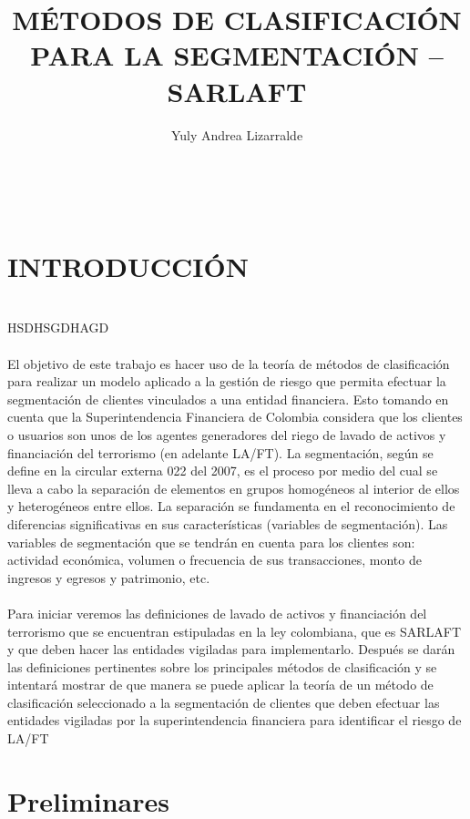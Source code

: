 \documentclass[letterpaper,12pt, spanish]{article}
\begin{document}
\setcounter{page}{1}
\newpage{\pagestyle{empty}\cleardoublepage}
\title{MÉTODOS DE CLASIFICACIÓN PARA LA SEGMENTACIÓN – SARLAFT}
\author{Yuly Andrea Lizarralde}
\date{}
\maketitle
\ \\
\newpage{\pagestyle{empty}\cleardoublepage}
\tableofcontents{}
\newpage{\pagestyle{empty}\cleardoublepage}
\section{INTRODUCCIÓN}
\ \\
HSDHSGDHAGD
\ \\
\ \\
El objetivo de este trabajo es hacer uso de la teoría de métodos de clasificación para  realizar un modelo aplicado a la gestión de riesgo que permita efectuar la segmentación de clientes vinculados a una entidad financiera.  Esto tomando en cuenta que la Superintendencia Financiera de Colombia considera que los clientes o usuarios son unos de los agentes generadores del riego de lavado de activos y financiación del terrorismo (en adelante LA/FT). La segmentación, según se define en la circular externa 022 del 2007, es el proceso por medio del cual se lleva a cabo la separación de elementos en grupos homogéneos al interior de ellos y heterogéneos entre ellos. La separación se fundamenta en el reconocimiento de diferencias significativas en sus características (variables de segmentación).  Las variables de segmentación que se tendrán en cuenta para los clientes son: actividad económica, volumen o frecuencia de sus transacciones, monto de ingresos y egresos y patrimonio, etc.
\ \\
\ \\
Para iniciar veremos las definiciones de lavado de activos y financiación del terrorismo que se encuentran estipuladas en la ley colombiana, que es SARLAFT y que deben hacer las entidades vigiladas para implementarlo.  Después se darán las definiciones pertinentes sobre los principales métodos de clasificación y se intentará mostrar de que manera se puede aplicar la teoría de un método de clasificación seleccionado a la segmentación de clientes que deben efectuar las entidades vigiladas por la superintendencia financiera para identificar el riesgo de LA/FT



\section{Preliminares}
\end{document}
